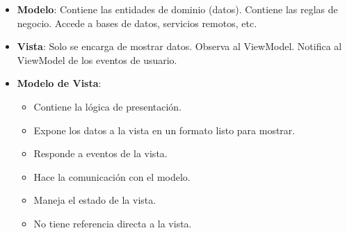 \begin{itemize}
    \item \textbf{Modelo}: Contiene las entidades de dominio (datos). Contiene las reglas de negocio. Accede a bases de datos, servicios remotos, etc.
    \item \textbf{Vista}: Solo se encarga de mostrar datos. Observa al ViewModel. Notifica al ViewModel de los eventos de usuario.
    \item \textbf{Modelo de Vista}:
          \begin{itemize}
              \item Contiene la lógica de presentación.
              \item Expone los datos a la vista en un formato listo para mostrar.
              \item Responde a eventos de la vista.
              \item Hace la comunicación con el modelo.
              \item Maneja el estado de la vista.
              \item No tiene referencia directa a la vista.
          \end{itemize}

\end{itemize}
